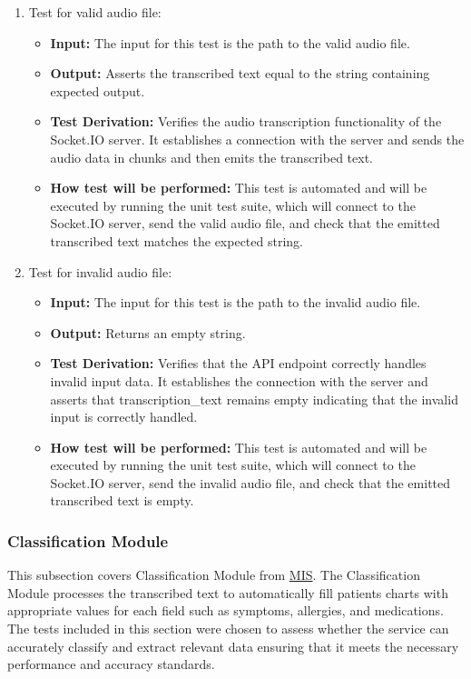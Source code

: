 \documentclass[12pt, titlepage]{article}
\begin{document}
\begin{enumerate}
  \item Test for valid audio file:
    \begin{itemize}
      \item \textbf{Input:} The input for this test is the path to the valid audio file.   
      \item \textbf{Output:} Asserts the transcribed text equal to the string containing expected output.
      \item \textbf{Test Derivation:} Verifies the audio transcription functionality of the Socket.IO server. It establishes a connection with the server and sends the audio data in chunks and then emits the transcribed text. 
      \item \textbf{How test will be performed:} This test is automated and will be executed by running the unit test suite, which will connect to the Socket.IO server, send the valid audio file, and check that the emitted transcribed text matches the expected string.
    \end{itemize}

  \item Test for invalid audio file:
    \begin{itemize}
      \item \textbf{Input:} The input for this test is the path to the invalid audio file. 
      \item \textbf{Output:} Returns an empty string.  
      \item \textbf{Test Derivation:} Verifies that the API endpoint correctly handles invalid input data. It establishes the connection with the server and asserts that transcription\_text remains empty indicating that the invalid input is correctly handled.
      \item \textbf{How test will be performed:} This test is automated and will be executed by running the unit test suite, which will connect to the Socket.IO server, send the invalid audio file, and check that the emitted transcribed text is empty.
    \end{itemize}
\end{enumerate}

\subsubsection{Classification Module}

This subsection covers Classification Module from \href{https://github.com/PKALXI/RapidCare/blob/main/docs/Design/SoftDetailedDes/MIS.pdf}{MIS}. The Classification Module processes the transcribed text to automatically fill patients charts with appropriate values for each field such as symptoms, allergies, and medications. The tests included in this section were chosen to assess whether the service can accurately classify and extract relevant data ensuring that it meets the necessary performance and accuracy standards.
\end{document}
